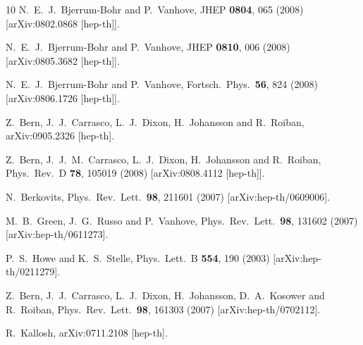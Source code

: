 \documentclass[12pt]{article}
\begin{document}
\begin{thebibliography}{10}
  N.~E.~J.~Bjerrum-Bohr and P.~Vanhove,
  JHEP {\bf 0804}, 065 (2008)
  [arXiv:0802.0868 [hep-th]].

  N.~E.~J.~Bjerrum-Bohr and P.~Vanhove,
  JHEP {\bf 0810}, 006 (2008)
  [arXiv:0805.3682 [hep-th]].

 N.~E.~J.~Bjerrum-Bohr and P.~Vanhove,
  Fortsch.\ Phys.\  {\bf 56}, 824 (2008)
  [arXiv:0806.1726 [hep-th]].

  Z.~Bern, J.~J.~Carrasco, L.~J.~Dixon, H.~Johansson and R.~Roiban,
  arXiv:0905.2326 [hep-th].

  Z.~Bern, J.~J.~M.~Carrasco, L.~J.~Dixon, H.~Johansson and R.~Roiban,
  Phys.\ Rev.\  D {\bf 78}, 105019 (2008)
  [arXiv:0808.4112 [hep-th]].

 N.~Berkovits,
  Phys.\ Rev.\ Lett.\  {\bf 98}, 211601 (2007)
  [arXiv:hep-th/0609006].

  M.~B.~Green, J.~G.~Russo and P.~Vanhove,
  Phys.\ Rev.\ Lett.\  {\bf 98}, 131602 (2007)
  [arXiv:hep-th/0611273].

  P.~S.~Howe and K.~S.~Stelle,
  Phys.\ Lett.\  B {\bf 554}, 190 (2003)
  [arXiv:hep-th/0211279].

  Z.~Bern, J.~J.~Carrasco, L.~J.~Dixon, H.~Johansson, D.~A.~Kosower and R.~Roiban,
  Phys.\ Rev.\ Lett.\  {\bf 98}, 161303 (2007)
  [arXiv:hep-th/0702112].

  R.~Kallosh,
  arXiv:0711.2108 [hep-th].


\end{thebibliography}
\end{document}
